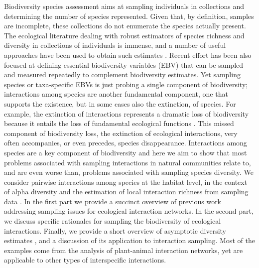 \documentclass[12pt]{article}
\begin{document}
\linenumbers
Biodiversity species assessment aims at sampling individuals in collections and determining the number of species represented. Given that, by definition, samples are incomplete, these collections do not enumerate the species actually present. The ecological literature dealing with robust estimators of species richness and diversity in collections of individuals is immense, and a number of useful approaches have been used to obtain such estimates \citep{Magurran:1988mm,Gotelli:2001uo,Colwell:2004fi,Hortal:2006dc,Colwell:2009gv,Gotelli:2011tb,Chao:2014wm}. Recent effort has been also focused at defining essential biodiversity variables (EBV) \citep{Pereira:2013ji} that can be sampled and measured repeatedly to complement biodiversity estimates. Yet sampling species or taxa-specific EBVs is just probing a single component of biodiversity; interactions among species are another fundamental component, one that supports the existence, but in some cases also the extinction, of species. For example, the extinction of interactions represents a dramatic loss of biodiversity because it entails the loss of fundamental ecological functions \citep{ValienteBanuet:2014bw}. This missed component of biodiversity loss, the extinction of ecological interactions, very often accompanies, or even precedes, species disappearance. Interactions among species are a key component of biodiversity and here we aim to show that most problems associated with sampling interactions in natural communities relate to, and are even worse than, problems associated with sampling species diversity. We consider pairwise interactions among species at the habitat level, in the context of alpha diversity and the estimation of local interaction richness from sampling data \citep{Chao:2014wm}. In the first part we provide a succinct overview of previous work addressing sampling issues for ecological interaction networks. In the second part, we discuss specific rationales for sampling the biodiversity of ecological interactions. Finally, we provide a short overview of asymptotic diversity estimates \citep{Gotelli:2001uo}, and a discussion of its application to interaction sampling. Most of the examples come from the analysis of plant-animal interaction networks, yet are applicable to other types of interspecific interactions.
\end{document}
